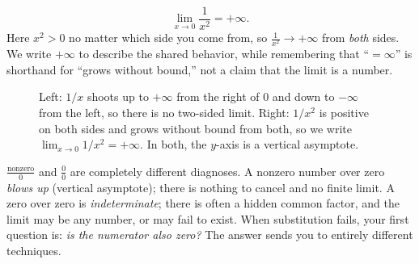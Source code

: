 \begin{example}
\label{ch07:ex-blowup2}
\[
  \lim_{x\to 0}\frac{1}{x^{2}} = +\infty.
\]
Here $x^2 > 0$ no matter which side you come from, so $\frac{1}{x^2}\to+\infty$
from \emph{both} sides. We write $+\infty$ to describe the shared behavior,
while remembering that ``$=\infty$'' is shorthand for ``grows without bound,''
not a claim that the limit is a number.
\end{example}

\begin{figure}[htbp]
\centering
{}
\caption{Left: $1/x$ shoots up to $+\infty$ from the right of $0$ and down to
$-\infty$ from the left, so there is no two-sided limit. Right: $1/x^{2}$ is
positive on both sides and grows without bound from both, so we write
$\lim_{x\to 0}1/x^{2}=+\infty$. In both, the $y$-axis is a vertical asymptote.}
\label{ch07:fig-blowup}
\end{figure}

\begin{trapbox}
$\frac{\text{nonzero}}{0}$ and $\frac{0}{0}$ are completely different
diagnoses. A nonzero number over zero \emph{blows up} (vertical asymptote);
there is nothing to cancel and no finite limit. A zero over zero is
\emph{indeterminate}; there is often a hidden common factor, and the limit may be any
number, or may fail to exist. When substitution fails, your first question is: \emph{is
the numerator also zero?} The answer sends you to entirely different
techniques.
\end{trapbox}

